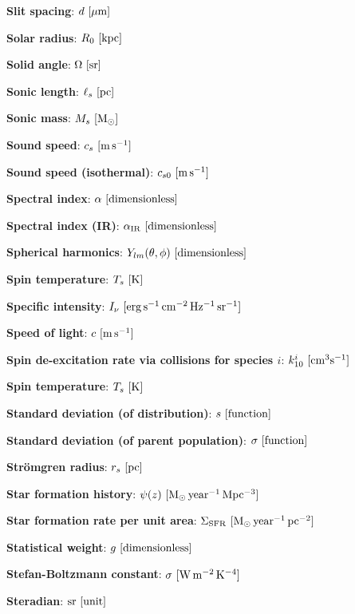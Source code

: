 \documentclass[a4paper,10pt]{article}
\begin{document}
{\noindent}\textbf{Slit spacing}: $d ~ [{\rm \mu m}]$

{\noindent}\textbf{Solar radius}: $R_0 ~ [{\rm kpc}]$

{\noindent}\textbf{Solid angle}: $\Omega ~ [{\rm sr}]$

{\noindent}\textbf{Sonic length}: $\ell_s ~ [{\rm pc}]$

{\noindent}\textbf{Sonic mass}: $M_s ~ [{\rm M_\odot}]$

{\noindent}\textbf{Sound speed}: $c_s ~ [{\rm m\,s^{-1}}]$

{\noindent}\textbf{Sound speed (isothermal)}: $c_{s0} ~ [{\rm m\,s^{-1}}]$

{\noindent}\textbf{Spectral index}: $\alpha ~ [{\rm dimensionless}]$

{\noindent}\textbf{Spectral index (IR)}: $\alpha_{\rm IR} ~ [{\rm dimensionless}]$

{\noindent}\textbf{Spherical harmonics}: $Y_{lm}(\theta,\phi) ~ [{\rm dimensionless}]$

{\noindent}\textbf{Spin temperature}: $T_s ~ [{\rm K}]$

{\noindent}\textbf{Specific intensity}: $I_\nu ~ [{\rm erg\,s^{-1}\,cm^{-2}\,Hz^{-1}\,sr^{-1}}]$

{\noindent}\textbf{Speed of light}: $c ~ [{\rm m\,s^{-1}}]$

{\noindent}\textbf{Spin de-excitation rate via collisions for species $i$}: $k_{10}^i ~ [{\rm cm^3s^{-1}}]$

{\noindent}\textbf{Spin temperature}: $T_s ~ [{\rm K}]$

{\noindent}\textbf{Standard deviation (of distribution)}: $s ~ [{\rm function}]$

{\noindent}\textbf{Standard deviation (of parent population)}: $\sigma ~ [{\rm function}]$

{\noindent}\textbf{Str\"omgren radius}: $r_s ~ [{\rm pc}]$

{\noindent}\textbf{Star formation history}: $\psi(z) ~ [{\rm M_\odot\,year^{-1}\,Mpc^{-3}}]$

{\noindent}\textbf{Star formation rate per unit area}: $\Sigma_\mathrm{SFR} ~ [{\rm M_\odot\,year^{-1}\,pc^{-2}}]$

{\noindent}\textbf{Statistical weight}: $g ~ [{\rm dimensionless}]$

{\noindent}\textbf{Stefan-Boltzmann constant}: $\sigma ~ [{\rm W\,m^{-2}\,K^{-4}}]$

{\noindent}\textbf{Steradian}: ${\rm sr} ~ [{\rm unit}]$
\end{document}
